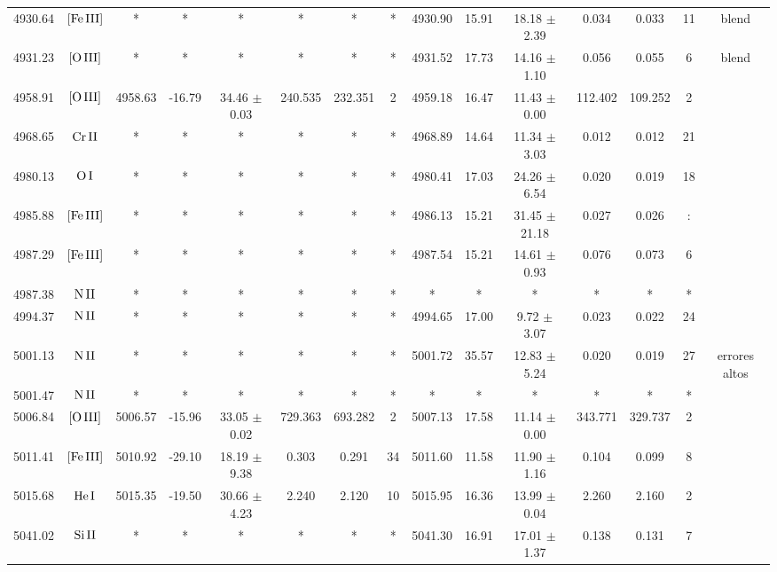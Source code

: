 \documentclass{article}
\begin{document}
\begin{table*}
\begin{adjustbox}{width=\textwidth}
\begin{tabular}{ccccccccccccccc}
4930.64 & $\mbox{[Fe}\thinspace \mbox{III]}$ & * & * & * & * & * & * & 4930.90 & 15.91 & 18.18 $\pm$ 2.39 & 0.034 & 0.033 & 11 &  blend \\
4931.23 & $\mbox{[O}\thinspace \mbox{III]}$ & * & * & * & * & * & * & 4931.52 & 17.73 & 14.16 $\pm$ 1.10 & 0.056 & 0.055 & 6 &  blend \\
4958.91 & $\mbox{[O}\thinspace \mbox{III]}$ & 4958.63 & -16.79 & 34.46 $\pm$ 0.03 & 240.535 & 232.351 & 2 & 4959.18 & 16.47 & 11.43 $\pm$ 0.00 & 112.402 & 109.252 & 2 &  \\
4968.65 & $\mbox{Cr}\thinspace \mbox{II}$ & * & * & * & * & * & * & 4968.89 & 14.64 & 11.34 $\pm$ 3.03 & 0.012 & 0.012 & 21 &  \\
4980.13 & $\mbox{O}\thinspace \mbox{I}$ & * & * & * & * & * & * & 4980.41 & 17.03 & 24.26 $\pm$ 6.54 & 0.020 & 0.019 & 18 &  \\
4985.88 & $\mbox{[Fe}\thinspace \mbox{III]}$ & * & * & * & * & * & * & 4986.13 & 15.21 & 31.45 $\pm$ 21.18 & 0.027 & 0.026 & : &  \\
4987.29 & $\mbox{[Fe}\thinspace \mbox{III]}$ & * & * & * & * & * & * & 4987.54 & 15.21 & 14.61 $\pm$ 0.93 & 0.076 & 0.073 & 6 &  \\
4987.38 & $\mbox{N}\thinspace \mbox{II}$ & * & * & * & * & * & * & * & * & * & * & * & * &  \\
4994.37 & $\mbox{N}\thinspace \mbox{II}$ & * & * & * & * & * & * & 4994.65 & 17.00 & 9.72 $\pm$ 3.07 & 0.023 & 0.022 & 24 &  \\
5001.13 & $\mbox{N}\thinspace \mbox{II}$ & * & * & * & * & * & * & 5001.72 & 35.57 & 12.83 $\pm$ 5.24 & 0.020 & 0.019 & 27 &  errores altos \\
5001.47 & $\mbox{N}\thinspace \mbox{II}$ & * & * & * & * & * & * & * & * & * & * & * & * &  \\
5006.84 & $\mbox{[O}\thinspace \mbox{III]}$ & 5006.57 & -15.96 & 33.05 $\pm$ 0.02 & 729.363 & 693.282 & 2 & 5007.13 & 17.58 & 11.14 $\pm$ 0.00 & 343.771 & 329.737 & 2 &  \\
5011.41 & $\mbox{[Fe}\thinspace \mbox{III]}$ & 5010.92 & -29.10 & 18.19 $\pm$ 9.38 & 0.303 & 0.291 & 34 & 5011.60 & 11.58 & 11.90 $\pm$ 1.16 & 0.104 & 0.099 & 8 &  \\
5015.68 & $\mbox{He}\thinspace \mbox{I}$ & 5015.35 & -19.50 & 30.66 $\pm$ 4.23 & 2.240 & 2.120 & 10 & 5015.95 & 16.36 & 13.99 $\pm$ 0.04 & 2.260 & 2.160 & 2 &  \\
5041.02 & $\mbox{Si}\thinspace \mbox{II}$ & * & * & * & * & * & * & 5041.30 & 16.91 & 17.01 $\pm$ 1.37 & 0.138 & 0.131 & 7 &  \\

\end{tabular}
\end{adjustbox}
\end{table*}
\end{document}
